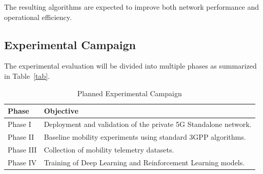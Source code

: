 \documentclass[12pt,a4paper]{article}\usepackage[a4paper,margin=1in]{geometry}\usepackage{graphicx}\usepackage{longtable}\usepackage{booktabs}\usepackage{hyperref}\usepackage{enumitem}\usepackage{amsmath}\usepackage{tikz}\usepackage{pgfgantt}\usepackage{setspace}\setstretch{1.15}\usetikzlibrary{positioning,arrows.meta,shapes.geometric}
\begin{document}
	The resulting algorithms are expected to improve both network performance and operational efficiency.
	
	
	\subsection{Experimental Campaign}
	
	The experimental evaluation will be divided into multiple phases as summarized in Table~\ref{tab}.
	
	\begin{table}[h]
		
		\centering
		
		\caption{Planned Experimental Campaign}
		
		\label{tab:campaign}
		
		\begin{tabular}{p{3cm}p{9cm}}
			
			\toprule
			
			Phase
			
			&
			
			Objective
			
			\\
			
			\midrule
			
			Phase I
			
			&
			
			Deployment and validation of the private 5G Standalone network.
			
			\\
			
			Phase II
			
			&
			
			Baseline mobility experiments using standard 3GPP algorithms.
			
			\\
			
			Phase III
			
			&
			
			Collection of mobility telemetry datasets.
			
			\\
			
			Phase IV
			
			&
			
			Training of Deep Learning and Reinforcement Learning models.
			
			\\
			

\end{tabular}
\end{table}
\end{document}
